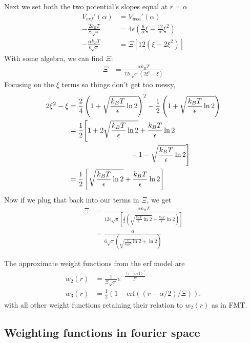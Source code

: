 \documentclass[letterpaper,twocolumn,amsmath,amssymb,prb]{revtex4-1}
\begin{document}
Next we set both the two potential's slopes equal at $r = \alpha$
\begin{align}
  V_{erf}'(\alpha) &= V_{wca}'(\alpha) \\
  -\frac{2 k_B T}{\Xi \sqrt{\pi}} &= 4\epsilon \left(
  \frac{6}{\alpha} \xi - \frac{12}{\alpha} \xi^2 \right) \\
  -\frac{\alpha k_B T}{\epsilon \sqrt{\pi}} &= \Xi \left[12 \left(
  \xi - 2\xi^2 \right)\right]
\end{align}
With some algebra, we can find $\Xi$:
\begin{align}
  \Xi &= \frac{\alpha k_B T}{12\epsilon \sqrt{\pi} \left( 2 \xi^2 - \xi
    \right)}
\end{align}
Focusing on the $\xi$ terms so things don't get too messy,
\begin{align}
  2 \xi^2 - \xi &=  \frac{2}{4}\left(1 +
  \sqrt{ \frac{k_BT}{\epsilon} \ln 2} \right)^2
  - \frac{1}{2}\left(1 +
  \sqrt{ \frac{k_BT}{\epsilon} \ln 2} \right) \\
  &= \frac{1}{2}\Bigg[ 1 + 2\sqrt{ \frac{k_BT}{\epsilon}\ln 2} +
    \frac{k_BT}{\epsilon}\ln 2 \notag \\
    &\hspace{3cm}-1 -\sqrt{ \frac{k_BT}{\epsilon} \ln 2} \Bigg] \\
  &=\frac{1}{2}\left[ \sqrt{ \frac{k_BT}{\epsilon} \ln 2} +
    \frac{k_BT}{\epsilon} \ln 2 \right]
\end{align}
Now if we plug that back into our terms in $\Xi$, we get
\begin{align}
  \Xi &= \frac{\alpha k_B T}{12\epsilon \sqrt{\pi} \left[\frac{1}{2}\left(
      \sqrt{ \frac{k_BT}{\epsilon} \ln 2} + \frac{k_BT}{\epsilon}
      \ln 2 \right)\right] } \\
  &= \frac{\alpha}{6\sqrt{\pi} \left( \sqrt{\frac{\epsilon}{k_BT} \ln
      2} + \ln 2 \right)}
\end{align}

The approximate weight functions from the erf model are
\begin{align}
  w_2(r) &= \frac{1}{\Xi \sqrt{\pi}} e^{-\frac{(r-\alpha/2)^2}{\Xi^2}} \\
  w_3(r) &= \tfrac12 ( 1 - \mathrm{erf}((r-\alpha/2)/\Xi) ).
\end{align}
with all other weight functions retaining their relation to $w_2(r)$
as in FMT.

\subsection{Weighting functions in fourier space}
\end{document}
